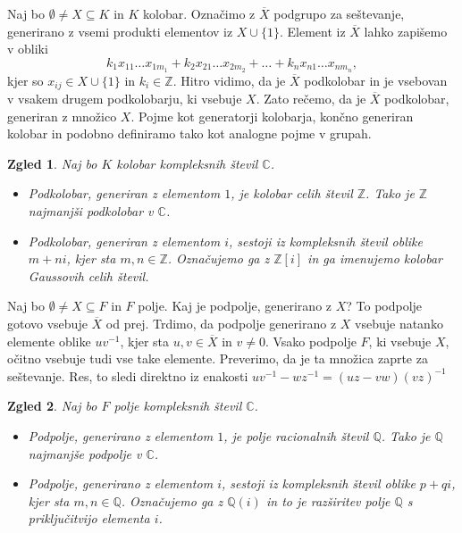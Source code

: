 \documentclass[10pt, a4paper]{article}
\newtheorem{zgled}{Zgled}[section]
\newcommand{\Z}{\mathbb {Z}}
\newcommand{\Q}{\mathbb {Q}}
\newcommand{\C}{\mathbb {C}}
\begin{document}
Naj bo $\emptyset \neq X \subseteq K$ in $K$ kolobar.
Označimo z $\overline{X}$ podgrupo za seštevanje, generirano z vsemi produkti elementov iz $X \cup \{1\}$.
Element iz $\overline{X}$ lahko zapišemo v obliki
$$k_1 x_{11} \dots x_{1{m_1}} + k_2 x_{21} \dots x_{2{m_2}} + \dots + k_n x_{n1} \dots x_{n{m_n}},$$
kjer so $x_{ij} \in X \cup \{1\}$ in $k_i \in \Z$.
Hitro vidimo, da je $\overline{X}$ podkolobar in je vsebovan v vsakem drugem podkolobarju, ki vsebuje $X$.
Zato rečemo, da je $\overline{X}$ podkolobar, generiran z množico $X$.
Pojme kot generatorji kolobarja, končno generiran kolobar in podobno definiramo tako kot analogne pojme v grupah.

\begin{zgled}
  Naj bo $K$ kolobar kompleksnih števil $\C$.
  \begin{itemize}
    \item Podkolobar, generiran z elementom $1$, je kolobar celih števil $\Z$.
    Tako je $\Z$ najmanjši podkolobar v $\C$.
    \item Podkolobar, generiran z elementom $i$, sestoji iz kompleksnih števil oblike $m + n i$, kjer sta $m, n \in \Z$.
    Označujemo ga z $\Z[i]$ in ga imenujemo kolobar Gaussovih celih števil.
  \end{itemize}
\end{zgled}

Naj bo $\emptyset \neq X \subseteq F$ in $F$ polje.
Kaj je podpolje, generirano z $X$?
To podpolje gotovo vsebuje $\overline{X}$ od prej.
Trdimo, da podpolje generirano z $X$ vsebuje natanko elemente oblike $u v^{-1}$, kjer sta $u, v \in \overline{X}$ in $v \neq 0.$
Vsako podpolje $F$, ki vsebuje $X$, očitno vsebuje tudi vse take elemente.
Preverimo, da je ta množica zaprte za seštevanje. Res, to sledi direktno iz enakosti $uv^{-1} - wz^{-1} = (uz - vw)(vz)^{-1}$

\begin{zgled}
  Naj bo $F$ polje kompleksnih števil $\C$.
  \begin{itemize}
    \item Podpolje, generirano z elementom $1$, je polje racionalnih števil $\Q$.
    Tako je $\Q$ najmanjše podpolje v $\C$.
    \item Podpolje, generirano z elementom $i$, sestoji iz kompleksnih števil oblike $p + q i$, kjer sta $m, n \in \Q$.
    Označujemo ga z $\Q(i)$ in to je razširitev polje $\Q$ s priključitvijo elementa $i$.
  \end{itemize}
\end{zgled}
\end{document}
